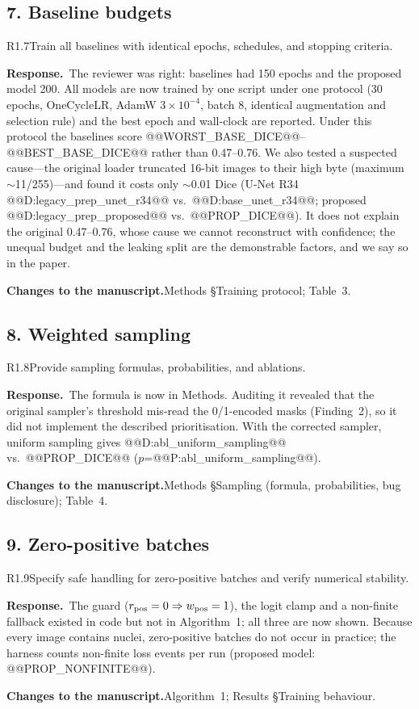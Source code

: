 \documentclass[11pt]{article}
\newcommand{\response}{\par\medskip\noindent\textbf{\color{bblue}Response.}\ }
\newcommand{\actions}{\par\medskip\noindent\textbf{Changes to the manuscript.}}
\begin{document}
\subsection*{7. Baseline budgets}
\begin{rcomment}{R1.7}Train all baselines with identical epochs, schedules, and stopping criteria.\end{rcomment}
\response The reviewer was right: baselines had 150 epochs and the proposed model 200. All models are now trained by one script under one protocol (30 epochs, OneCycleLR, AdamW $3\times10^{-4}$, batch 8, identical augmentation and selection rule) and the best epoch and wall-clock are reported. Under this protocol the baselines score @@WORST_BASE_DICE@@--@@BEST_BASE_DICE@@ rather than 0.47--0.76. We also tested a suspected cause---the original loader truncated 16-bit images to their high byte (maximum $\sim$11/255)---and found it costs only $\sim$0.01 Dice (U-Net R34 @@D:legacy_prep_unet_r34@@ vs.\ @@D:base_unet_r34@@; proposed @@D:legacy_prep_proposed@@ vs.\ @@PROP_DICE@@). It does not explain the original 0.47--0.76, whose cause we cannot reconstruct with confidence; the unequal budget and the leaking split are the demonstrable factors, and we say so in the paper.
\actions Methods §Training protocol; Table~3.

\subsection*{8. Weighted sampling}
\begin{rcomment}{R1.8}Provide sampling formulas, probabilities, and ablations.\end{rcomment}
\response The formula is now in Methods. Auditing it revealed that the original sampler's threshold mis-read the 0/1-encoded masks (Finding~2), so it did not implement the described prioritisation. With the corrected sampler, uniform sampling gives @@D:abl_uniform_sampling@@ vs.\ @@PROP_DICE@@ ($p$=@@P:abl_uniform_sampling@@).
\actions Methods §Sampling (formula, probabilities, bug disclosure); Table~4.

\subsection*{9. Zero-positive batches}
\begin{rcomment}{R1.9}Specify safe handling for zero-positive batches and verify numerical stability.\end{rcomment}
\response The guard ($r_{\rm pos}=0\Rightarrow w_{\rm pos}=1$), the logit clamp and a non-finite fallback existed in code but not in Algorithm~1; all three are now shown. Because every image contains nuclei, zero-positive batches do not occur in practice; the harness counts non-finite loss events per run (proposed model: @@PROP_NONFINITE@@).
\actions Algorithm~1; Results §Training behaviour.
\end{document}

